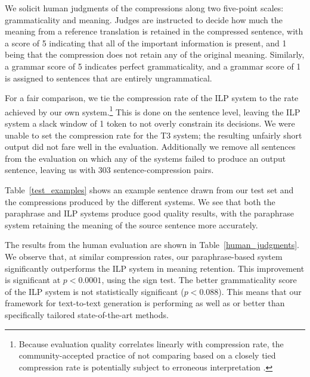 \documentclass[11pt]{article}
\begin{document}
We solicit human judgments of the compressions along two five-point
scales: grammaticality and meaning. Judges are instructed to decide
how much the meaning from a reference translation is retained in the
compressed sentence, with a score of 5 indicating that all of the
important information is present, and 1 being that the compression
does not retain any of the original meaning. Similarly, a grammar
score of 5 indicates perfect grammaticality, and a grammar score of 1
is assigned to sentences that are entirely ungrammatical.

For a fair comparison, we tie the compression rate of the ILP system
to the rate achieved by our own system.\footnote{Because 
evaluation quality correlates linearly with compression rate, 
 the community-accepted practice of not comparing based on
  a closely tied compression rate is potentially subject to erroneous
  interpretation \cite{Napoles2011}.} This is done on the sentence level, leaving the ILP
system a slack window of 1 token to not overly constrain its
decisions. We were unable to set the compression rate for the T3
system; the resulting unfairly short output did not fare well in the
evaluation.  Additionally we remove all sentences from the evaluation
on which any of the systems failed to produce an output sentence,
leaving us with 303 sentence-compression pairs.

Table~\ref{test_examples} shows an example sentence drawn from our
test set and the compressions produced by the different systems. We
see that both the paraphrase and ILP systems produce good quality
results, with the paraphrase system retaining the meaning of the
source sentence more accurately.

The results from the human evaluation are shown in
Table~\ref{human_judgments}. We observe that, at similar compression
rates, our paraphrase-based system significantly outperforms the ILP
system in meaning retention.  This improvement is significant
  at $p < 0.0001$, using the sign test. The better grammaticality score of the ILP
system is not statistically significant ($p < 0.088$). This means that
our framework for text-to-text generation is performing as well as or
better than specifically tailored state-of-the-art methods.
\end{document}
